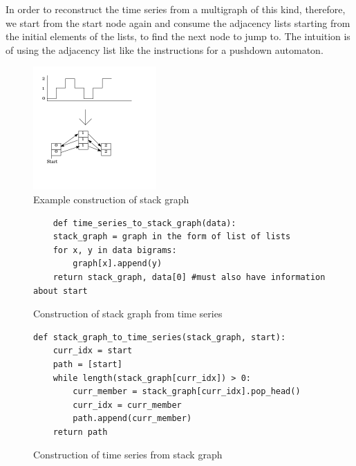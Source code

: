 \documentclass[12pt]{article}
\begin{document}
In order to reconstruct the time series from a multigraph of this kind, therefore, we start from the start node again and consume the adjacency lists starting from the initial elements of the lists, to find the next node to jump to. The intuition is of using the adjacency list like the instructions for a pushdown automaton\cite{pushdown}.

\begin{figure}\label{fig:stackgraph}
  \begin{center}
    \includegraphics[scale=0.6]{stack_graph_ex}
  \end{center}
  \caption{Example construction of stack graph}
\end{figure}

\begin{figure}\label{fig:stackconstructionalgo}
  \begin{singlespace}
    \begin{verbatim}
    def time_series_to_stack_graph(data):
    stack_graph = graph in the form of list of lists
    for x, y in data bigrams:
        graph[x].append(y)
    return stack_graph, data[0] #must also have information about start
    \end{verbatim}
  \end{singlespace}
  \caption{Construction of stack graph from time series}
\end{figure}

\begin{figure}\label{fig:timeconstructionalgo}
\begin{singlespace}
\begin{verbatim}
def stack_graph_to_time_series(stack_graph, start):
    curr_idx = start
    path = [start]
    while length(stack_graph[curr_idx]) > 0:
        curr_member = stack_graph[curr_idx].pop_head()
        curr_idx = curr_member
        path.append(curr_member)
    return path
\end{verbatim}
\end{singlespace}
  \caption{Construction of time series from stack graph}
\end{figure}
\end{document}
